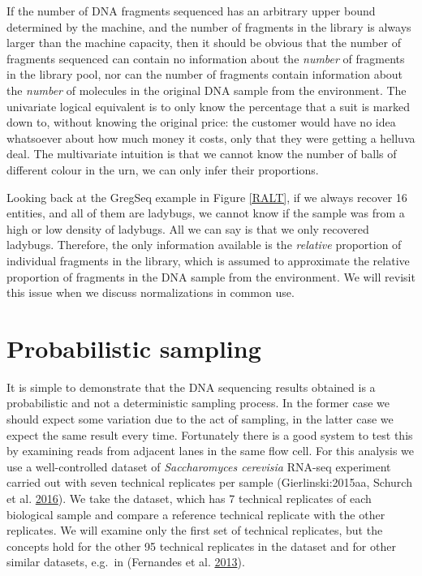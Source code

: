 \documentclass[onecolumn]{book}
\theoremstyle{definition}
\theoremstyle{definition}
\theoremstyle{definition}
\theoremstyle{remark}
\begin{document}
If the number of DNA fragments sequenced has an arbitrary upper bound
determined by the machine, and the number of fragments in the library is
always larger than the machine capacity, then it should be obvious that
the number of fragments sequenced can contain no information about the
\emph{number} of fragments in the library pool, nor can the number of
fragments contain information about the \emph{number} of molecules in
the original DNA sample from the environment. The univariate logical
equivalent is to only know the percentage that a suit is marked down to,
without knowing the original price: the customer would have no idea
whatsoever about how much money it costs, only that they were getting a
helluva deal. The multivariate intuition is that we cannot know the
number of balls of different colour in the urn, we can only infer their
proportions.

Looking back at the GregSeq example in Figure \ref{RALT}, if we always
recover 16 entities, and all of them are ladybugs, we cannot know if the
sample was from a high or low density of ladybugs. All we can say is
that we only recovered ladybugs. Therefore, the only information
available is the \emph{relative} proportion of individual fragments in
the library, which is assumed to approximate the relative proportion of
fragments in the DNA sample from the environment. We will revisit this
issue when we discuss normalizations in common use.

\hypertarget{probabilistic-sampling}{%
\section{Probabilistic sampling}\label{probabilistic-sampling}}

It is simple to demonstrate that the DNA sequencing results obtained is
a probabilistic and not a deterministic sampling process. In the former
case we should expect some variation due to the act of sampling, in the
latter case we expect the same result every time. Fortunately there is a
good system to test this by examining reads from adjacent lanes in the
same flow cell. For this analysis we use a well-controlled dataset of
\emph{Saccharomyces cerevisia} RNA-seq experiment carried out with seven
technical replicates per sample (Gierlinski:2015aa, Schurch et al.
\protect\hyperlink{ref-Schurch:2016aa}{2016}). We take the dataset,
which has 7 technical replicates of each biological sample and compare a
reference technical replicate with the other replicates. We will examine
only the first set of technical replicates, but the concepts hold for
the other 95 technical replicates in the dataset and for other similar
datasets, e.g.~in (Fernandes et al.
\protect\hyperlink{ref-fernandes:2013}{2013}).
\end{document}
